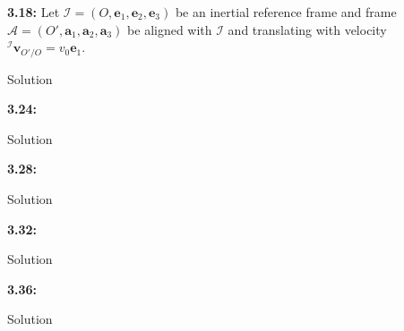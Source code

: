  

%
%

\newcommand{\hmwkTitle}{Homework 02}
\newcommand{\hmwkDueDate}{September 17, 2024}
\newcommand{\hmwkDueTime}{01:00 PM}
\newcommand{\hmwkClass}{ENAE 301}
\newcommand{\hmwkClassTime}{Section 0103}
\newcommand{\hmwkClassInstructor}{Dr. Paley}
\newcommand{\hmwkAuthorName}{\textbf{Vai Srivastava}}
\newcommand{\hmwkCompletionDate}{September 27, 2024}



\maketitle

\pagebreak

\begin{homeworkProblem}

	\textbf{3.18:} Let \( \mathcal{I} = \left( O, \mathbf{e}_{1}, \mathbf{e}_{2}, \mathbf{e}_{3} \right) \) be an inertial reference frame and frame \( \mathcal{A} = \left( O', \mathbf{a}_{1}, \mathbf{a}_{2}, \mathbf{a}_{3} \right) \) be aligned with \( \mathcal{I} \) and translating with velocity \( {}^{\mathcal{I}}\mathbf{v}_{O'/O} = v_{0}\mathbf{e}_{1} \).

	\solution

	Solution

\end{homeworkProblem}

\begin{homeworkProblem}

	\textbf{3.24:}

	\solution

	Solution

\end{homeworkProblem}

\begin{homeworkProblem}

	\textbf{3.28:}

	\solution

	Solution

\end{homeworkProblem}

\begin{homeworkProblem}

	\textbf{3.32:}

	\solution

	Solution

\end{homeworkProblem}

\begin{homeworkProblem}

	\textbf{3.36:}

	\solution

	Solution

\end{homeworkProblem}

